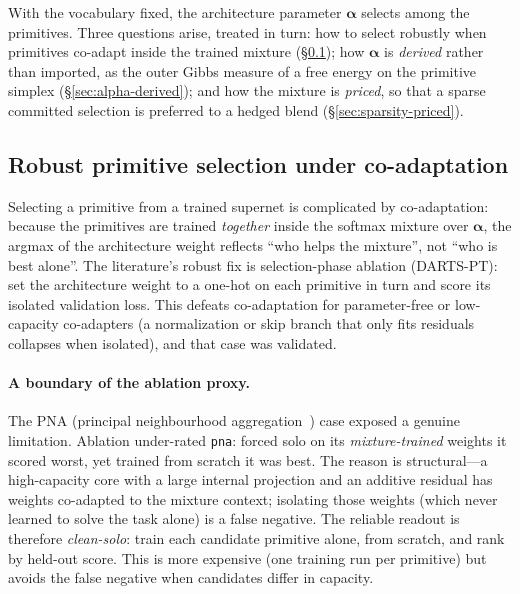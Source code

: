 \documentclass[11pt]{article}
\newcommand{\allowbreakhere}{\discretionary{}{}{}}
\newcommand{\code}[1]{\texttt{\def\_{\char`_\allowbreakhere}#1}}
\newcommand{\alphapar}{\bm{\alpha}}
\begin{document}
With the vocabulary fixed, the architecture parameter $\alphapar$ selects among the primitives. Three
questions arise, treated in turn: how to select robustly when primitives co-adapt inside the trained
mixture (\S\ref{sec:coadapt-impl}); how $\alphapar$ is \emph{derived} rather than imported, as the outer
Gibbs measure of a free energy on the primitive simplex (\S\ref{sec:alpha-derived}); and how the mixture
is \emph{priced}, so that a sparse committed selection is preferred to a hedged blend
(\S\ref{sec:sparsity-priced}).

\subsection{Robust primitive selection under co-adaptation}
\label{sec:coadapt-impl}

Selecting a primitive from a trained supernet is complicated by co-adaptation: because the primitives
are trained \emph{together} inside the softmax mixture over $\alphapar$, the argmax of the architecture
weight reflects ``who helps the mixture'', not ``who is best alone''. The literature's robust fix is
selection-phase ablation (DARTS-PT): set the architecture weight to a one-hot on each primitive in turn
and score its isolated validation loss. This defeats co-adaptation for parameter-free or low-capacity
co-adapters (a normalization or skip branch that only fits residuals collapses when isolated), and that
case was validated.

\paragraph{A boundary of the ablation proxy.} The PNA (principal neighbourhood aggregation~\cite{corso2020pna}) case exposed a genuine limitation. Ablation
under-rated \code{pna}: forced solo on its \emph{mixture-trained} weights it scored worst, yet trained
from scratch it was best. The reason is structural---a high-capacity core with a large internal
projection and an additive residual has weights co-adapted to the mixture context; isolating those
weights (which never learned to solve the task alone) is a false negative. The reliable readout is
therefore \emph{clean-solo}: train each candidate primitive alone, from scratch, and rank by held-out
score. This is more expensive (one training run per primitive) but avoids the false negative when
candidates differ in capacity.
\end{document}
